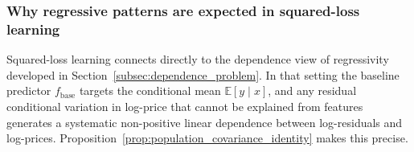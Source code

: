 \documentclass[12pt]{article}
\theoremstyle{plain}
\theoremstyle{definition}
\newcommand{\E}{\mathbb{E}}
\newcommand{\1}{\mathbf{1}}
\begin{document}


\subsubsection{Why regressive patterns are expected in squared-loss learning}
\label{subsec:squared_loss_regressivity}

Squared-loss learning connects directly to the dependence view of regressivity developed in Section~\ref{subsec:dependence_problem}. In that setting the baseline predictor $f_{\mathrm{base}}$ targets the conditional mean $\E[y\mid x]$, and any residual conditional variation in log-price that cannot be explained from features generates a systematic non-positive linear dependence between log-residuals and log-prices. Proposition~\ref{prop:population_covariance_identity} makes this precise.



\end{document}
